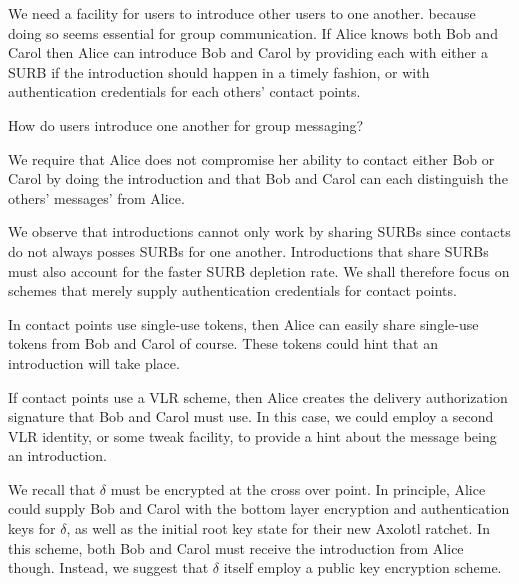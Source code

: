 We need a facility for users to introduce other users to one another.
because doing so seems essential for group communication.  If Alice 
knows both Bob and Carol then Alice can introduce Bob and Carol by
providing each with either a SURB if the introduction should happen
in a timely fashion, or with authentication credentials for each others'
contact points.  

\begin{issue}
How do users introduce one another for group messaging?
\end{issue}

We require that Alice does not compromise her ability to contact
either Bob or Carol by doing the introduction and that Bob and Carol
can each distinguish the others' messages' from Alice. 

We observe that introductions cannot only work by sharing SURBs since
contacts do not always posses SURBs for one another.  Introductions
that share SURBs must also account for the faster SURB depletion rate.
We shall therefore focus on schemes that merely supply authentication
credentials for contact points.

In contact points use single-use tokens, then Alice can easily share
single-use tokens from Bob and Carol of course.  These tokens could
hint that an introduction will take place.

If contact points use a VLR scheme, then Alice creates the delivery
authorization signature that Bob and Carol must use.  In this case,
we could employ a second VLR identity, or some tweak facility, to
provide a hint about the message being an introduction. 

We recall that $\delta$ must be encrypted at the cross over point.
In principle, Alice could supply Bob and Carol with the bottom layer
encryption and authentication keys for $\delta$, as well as the
initial root key state for their new Axolotl ratchet.  %
In this scheme, both Bob and Carol must receive the introduction
from Alice though.  Instead, we suggest that $\delta$ itself employ
a public key encryption scheme.



 


